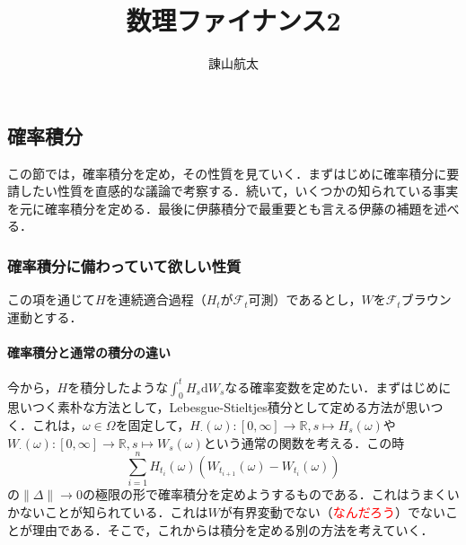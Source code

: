 \documentclass{jsarticle}
\title{数理ファイナンス2}
\author{諌山航太}
\theoremstyle{definition}
\begin{document}
\maketitle

\subsection{確率積分}
この節では，確率積分を定め，その性質を見ていく．まずはじめに確率積分に要請したい性質を直感的な議論で考察する．続いて，いくつかの知られている事実を元に確率積分を定める．最後に伊藤積分で最重要とも言える伊藤の補題を述べる．

\subsubsection{確率積分に備わっていて欲しい性質}
この項を通じて$H$を連続適合過程（$H_t$が$\mathscr{F}_t$可測）であるとし，$W$を$\mathscr{F}_t$ブラウン運動とする．

\paragraph{確率積分と通常の積分の違い}
今から，$H$を積分したような$\int_0^t H_s \mathrm{d}W_s$なる確率変数を定めたい．まずはじめに思いつく素朴な方法として，Lebesgue-Stieltjes積分として定める方法が思いつく．これは，$\omega\in \Omega$を固定して，$H_{\cdot}(\omega): [0, \infty] \rightarrow \mathbb{R}, s \mapsto H_s(\omega)$や$W_{\cdot}(\omega): [0, \infty] \rightarrow \mathbb{R}, s \mapsto W_s(\omega)$という通常の関数を考える．この時
$$
    \sum_{i=1}^{n}H_{t_i}(\omega)\left(W_{t_{i+1}}(\omega) - W_{t_i}(\omega)\right)
$$
の$\|\Delta\| \rightarrow 0$の極限の形で確率積分を定めようするものである．これはうまくいかないことが知られている．これは$W$が有界変動でない（\textcolor{red}{なんだろう}）でないことが理由である．そこで，これからは積分を定める別の方法を考えていく．\par
\end{document}
